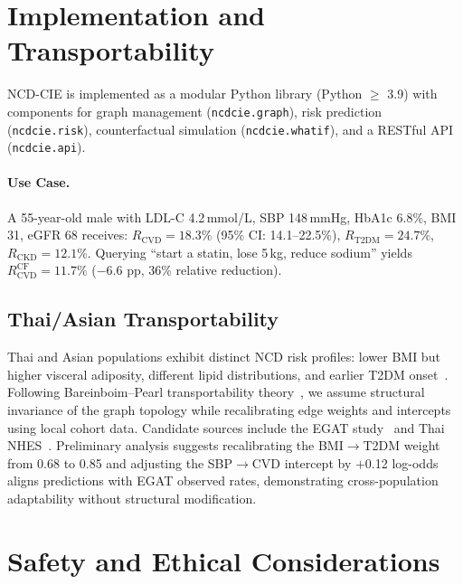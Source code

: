 \documentclass[runningheads]{llncs}
\begin{document}
\section{Implementation and Transportability}\label{sec:impl}

NCD-CIE is implemented as a modular Python library (Python $\geq$
3.9) with components for graph management (\texttt{ncdcie.graph}),
risk prediction (\texttt{ncdcie.risk}), counterfactual simulation
(\texttt{ncdcie.whatif}), and a RESTful API (\texttt{ncdcie.api}).

\paragraph{Use Case.}
A 55-year-old male with LDL-C 4.2\,mmol/L, SBP 148\,mmHg, HbA1c
6.8\%, BMI 31, eGFR 68 receives: $R_{\text{CVD}} = 18.3\%$ (95\% CI:
14.1--22.5\%), $R_{\text{T2DM}} = 24.7\%$, $R_{\text{CKD}} = 12.1\%$.
Querying ``start a statin, lose 5\,kg, reduce sodium'' yields
$R_{\text{CVD}}^{\text{CF}} = 11.7\%$ ($-$6.6 pp, 36\% relative
reduction).

\subsection{Thai/Asian Transportability}\label{sec:thai}

Thai and Asian populations exhibit distinct NCD risk profiles: lower
BMI but higher visceral adiposity, different lipid distributions, and
earlier T2DM onset~\cite{aekplakorn2011thai}.  Following
Bareinboim--Pearl transportability
theory~\cite{bareinboim2016causal}, we assume structural invariance
of the graph topology while recalibrating edge weights and intercepts
using local cohort data.  Candidate sources include the EGAT
study~\cite{sritara2003egat} and Thai NHES~\cite{aekplakorn2011thai}.
Preliminary analysis suggests recalibrating the BMI$\rightarrow$T2DM
weight from 0.68 to 0.85 and adjusting the SBP$\rightarrow$CVD
intercept by $+$0.12 log-odds aligns predictions with EGAT observed
rates, demonstrating cross-population adaptability without structural
modification.

\section{Safety and Ethical Considerations}\label{sec:ethics}
\end{document}
